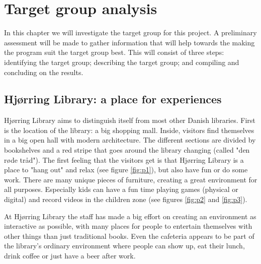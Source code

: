 \chapter{Target group analysis}
In this chapter we will investigate the target group for this project. A preliminary assessment will be made to gather information that will help towards the making the program suit the target group best. This will consist of three steps: identifying the target group; describing the target group; and compiling and concluding on the results.

\section{Hj{\o}rring Library: a place for experiences}\label{hjoerring}

Hj{\o}rring Library aims to distinguish itself from most other Danish libraries. First is the location of the library: a big shopping mall. Inside, visitors find themselves in a big open hall with modern architecture. The different sections are divided by bookshelves and a red stripe that goes around the library changing (called "den r{\o}de tr{\aa}d"). The first feeling that the visitors get is that Hj{\o}rring Library is a place to "hang out" and relax (see figure \ref{fig:p1}), but also have fun or do some work. There are many unique pieces of furniture, creating a great environment for all purposes. Especially kids can have a fun time playing games (physical or digital) and record videos in the children zone (see figures \ref{fig:p2} and \ref{fig:p3}).

At Hj{\o}rring Library the staff has made a big effort on creating an environment as interactive as possible, with many places for people to entertain themselves with other things than just traditional books. Even the cafeteria appears to be part of the library's ordinary environment where people can show up, eat their lunch, drink coffee or just have a beer after work.

